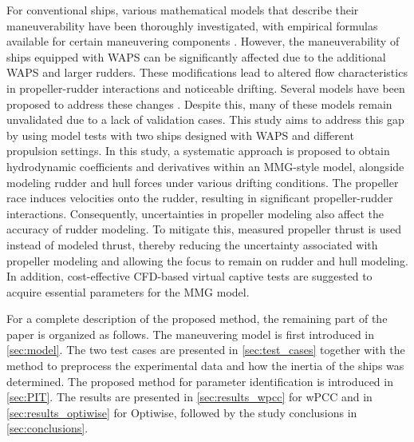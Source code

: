 For conventional ships, various mathematical models that describe their maneuverability have been thoroughly investigated, with empirical formulas available for certain maneuvering components \citep{yasukawaIntroductionMMGStandard2015}. However, the maneuverability of ships equipped with WAPS can be significantly affected due to the additional WAPS and larger rudders. These modifications lead to altered flow characteristics in propeller-rudder interactions and noticeable drifting.
Several models have been proposed to address these changes \citep{violaNumericalMethodDesign2015,tillig4DOFSimulation2019,kjellbergSailingPerformanceWindPowered2023,guzelbulutInvestigationEfficiencyWindassisted2024a}. Despite this, many of these models remain unvalidated due to a lack of validation cases. This study aims to address this gap by using model tests with two ships designed with WAPS and different propulsion settings.
In this study, a systematic approach is proposed to obtain hydrodynamic coefficients and derivatives within an MMG-style model, alongside modeling rudder and hull forces under various drifting conditions. The propeller race induces velocities onto the rudder, resulting in significant propeller-rudder interactions. Consequently, uncertainties in propeller modeling also affect the accuracy of rudder modeling. To mitigate this, measured propeller thrust is used instead of modeled thrust, thereby reducing the uncertainty associated with propeller modeling and allowing the focus to remain on rudder and hull modeling. In addition, cost-effective CFD-based virtual captive tests are suggested to acquire essential parameters for the MMG model. 

For a complete description of the proposed method, the remaining part of the paper is organized as follows. The maneuvering model is first introduced in \autoref{sec:model}. The two test cases are presented in \autoref{sec:test_cases} together with the method to preprocess the experimental data and how the inertia of the ships was determined. The proposed method for parameter identification is introduced in \autoref{sec:PIT}. The results are presented in \autoref{sec:results_wpcc} for wPCC and in \autoref{sec:results_optiwise} for Optiwise, followed by the study conclusions in \autoref{sec:conclusions}.



